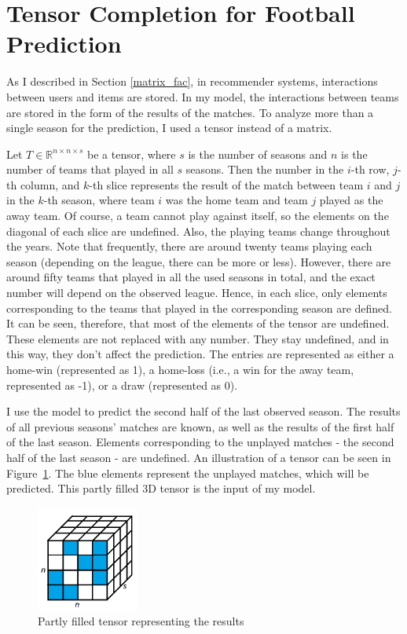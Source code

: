 \documentclass[thesis=M,english]{FITthesis}[2019/12/23]
\begin{document}
\section{Tensor Completion for Football Prediction}
\label{model}
As I described in Section \ref{matrix_fac}, in recommender systems, interactions between users and items are stored. In my model, the interactions between teams are stored in the form of the results of the matches. To analyze more than a single season for the prediction, I used a tensor instead of a matrix.

Let $T \in \mathbb{R}^{n \times n \times s}$ be a tensor, where $s$ is the number of seasons and $n$ is the number of teams that played in all $s$ seasons. Then the number in the $i$-th row, $j$-th column, and $k$-th slice represents the result of the match between team $i$ and $j$ in the $k$-th season, where team $i$ was the home team and team $j$ played as the away team. Of course, a team cannot play against itself, so the elements on the diagonal of each slice are undefined. Also, the playing teams change throughout the years. Note that frequently, there are around twenty teams playing each season (depending on the league, there can be more or less). However, there are around fifty teams that played in all the used seasons in total, and the exact number will depend on the observed league. Hence, in each slice, only elements corresponding to the teams that played in the corresponding season are defined. It can be seen, therefore, that most of the elements of the tensor are undefined. These elements are not replaced with any number. They stay undefined, and in this way, they don't affect the prediction. The entries are represented as either a home-win (represented as 1), a home-loss (i.e., a win for the away team, represented as -1), or a draw (represented as 0).

I use the model to predict the second half of the last observed season. The results of all previous seasons' matches are known, as well as the results of the first half of the last season. Elements corresponding to the unplayed matches - the second half of the last season - are undefined. An illustration of a tensor can be seen in Figure~\ref{fig:tensor}. The blue elements represent the unplayed matches, which will be predicted. This partly filled 3D tensor is the input of my model.

\begin{figure}[h]
    \centering
    \includegraphics[width=0.3\textwidth]{figures/tensor1.PNG}
    \caption{Partly filled tensor representing the results}
    \label{fig:tensor}
\end{figure}
\end{document}
